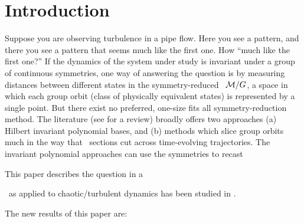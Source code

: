 \documentclass[%
 reprint,%
 amssymb, amsmath,%
 aip,cha,%
 graphicx
]{revtex4-1}
\begin{document}
\section{Introduction}
\label{sec:intro}

Suppose you are observing turbulence in a pipe flow. Here you see a
pattern, and there you see a pattern that seems much like the first one.
How ``much like the first one?'' If the dynamics of the system under study is invariant under
a group of continuous symmetries, one way of answering the question is by
measuring distances between different states in the
symmetry-reduced \statesp\ $\pS/\Group$, a space in which each group orbit (class
of physically equivalent states) is represented by a single point.
But there exist no preferred, one-size fits all
symmetry-reduction method. The literature
(see  for a review) broadly
offers two approaches (a) Hilbert invariant polynomial bases, and (b) methods which
slice group orbits much in the way that \Poincare\ sections cut across
time-evolving trajectories. The invariant polynomial approaches can use
the symmetries to recast

This paper describes  the question in a


\Mslices\ as applied to chaotic/turbulent dynamics has been
studied in .

The new results of this paper are:
\end{document}
